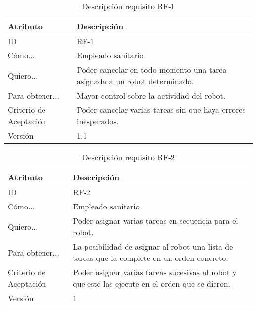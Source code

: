 \begin{table}[H]
    \label{tab:reqF1}
 	\caption{Descripción requisito RF-1}
	\centering
	
	\begin{tabular}{C{3cm}|C{12cm}}
 		\toprule
 		\textbf{Atributo} & \textbf{Descripción} \\
 		\midrule
 	    ID & RF-1 \\
 	    Cómo... & Empleado sanitario \\
 	    Quiero... & Poder cancelar en todo momento una tarea asignada a un robot determinado. \\
 	    Para obtener... & Mayor control sobre la actividad del robot. \\
 	    Criterio de Aceptación & Poder cancelar varias tareas sin que haya errores inesperados. \\
 	    Versión & 1.1 \\
 		\bottomrule
 		\end{tabular}
\end{table}

\begin{table}[H]
    \label{tab:reqF2}
 	\caption{Descripción requisito RF-2}
	\centering
	
	\begin{tabular}{C{3cm}|C{12cm}}
 		\toprule
 		\textbf{Atributo} & \textbf{Descripción} \\
 		\midrule
 	    ID & RF-2 \\
 	    Cómo... & Empleado sanitario \\
 	    Quiero... & Poder asignar varias tareas en secuencia para el robot. \\
 	    Para obtener... & La posibilidad de asignar al robot una lista de tareas que la complete en un orden concreto.  \\
 	    Criterio de Aceptación & Poder asignar varias tareas sucesivas al robot y que este las ejecute en el orden que se dieron. \\
 	    Versión & 1 \\
 		\bottomrule
 		\end{tabular}
\end{table}

